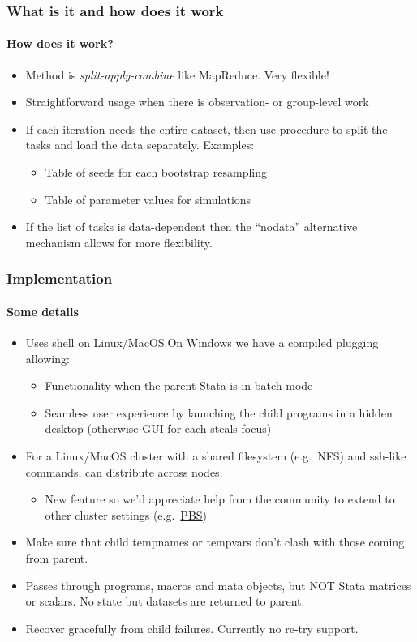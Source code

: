 \documentclass[9pt,\ExtraDocOpts]{beamer}
\begin{document}
\begin{frame} %
\frametitle{What is it and how does it work}
\framesubtitle{How does it work?}

\begin{itemize}
\item Method is \textit{split-apply-combine} like MapReduce. Very flexible!\pause{}
\item Straightforward usage when there is observation- or group-level work\pause{}
\item If each iteration needs the entire dataset, then use procedure to split the tasks and load the data separately. Examples:\pause{}
\begin{itemize}
\item Table of seeds for each bootstrap resampling\pause{}
\item Table of parameter values for simulations\pause{}
\end{itemize}
\item If the list of tasks is data-dependent then the ``nodata'' alternative mechanism allows for more flexibility.
\end{itemize}

\end{frame}


\begin{frame}
\frametitle{Implementation }
\framesubtitle{Some details}
\begin{itemize}
\item Uses shell on Linux/MacOS.\@ On Windows we have a compiled plugging allowing:\pause{}
\begin{itemize}
\item Functionality when the parent Stata is in batch-mode\pause{}
\item Seamless user experience by launching the child programs in a hidden desktop (otherwise GUI for each steals focus)\pause{}
\end{itemize}
\item For a Linux/MacOS cluster with a shared filesystem (e.g.\ NFS) and ssh-like commands, can distribute across nodes. \pause{}
\begin{itemize}
\item New feature so we'd appreciate help from the community to extend to other cluster settings (e.g.\ \href{https://en.wikipedia.org/wiki/Portable_Batch_System}{PBS})\pause{}
\end{itemize}
\item Make sure that child tempnames or tempvars don't clash with those coming from parent.\pause{}
\item Passes through programs, macros and mata objects, but NOT Stata matrices or scalars. No state but datasets are returned to parent.\pause{}
\item Recover gracefully from child failures. Currently no re-try support.
\end{itemize}
\end{frame}
\end{document}
